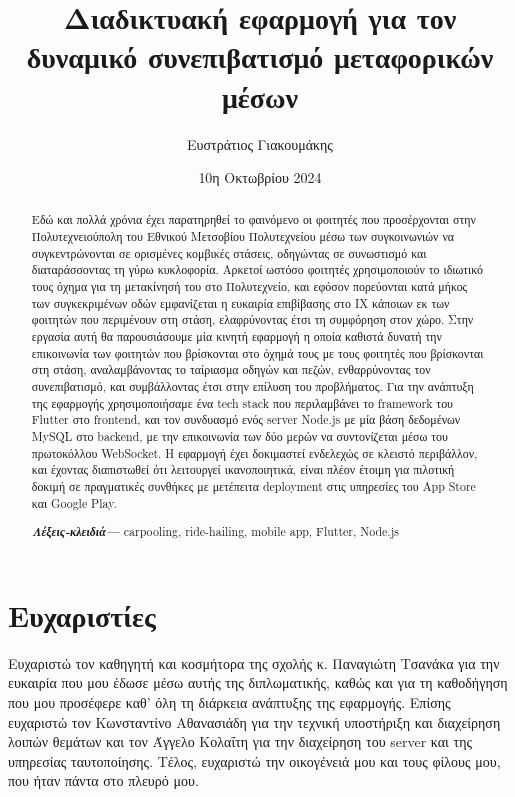 \documentclass[a4paper, 11pt]{report}
\title{
    {Διαδικτυακή εφαρμογή για τον δυναμικό συνεπιβατισμό μεταφορικών μέσων}
}
\author{Ευστράτιος Γιακουμάκης}
\date{10η Οκτωβρίου 2024}
\newcommand\blankpage{%
    \null
    \thispagestyle{empty}%
    \newpage
    }
\begin{document}
\maketitle

\begin{abstract}\thispagestyle{plain}
    Εδώ και πολλά χρόνια έχει παρατηρηθεί το φαινόμενο οι φοιτητές που προσέρχονται στην Πολυτεχνειούπολη του Εθνικού Μετσοβίου Πολυτεχνείου μέσω των συγκοινωνιών να συγκεντρώνονται σε ορισμένες κομβικές στάσεις, οδηγώντας σε συνωστισμό και διαταράσσοντας τη γύρω κυκλοφορία.
    Αρκετοί ωστόσο φοιτητές χρησιμοποιούν το ιδιωτικό τους όχημα για τη μετακίνησή του στο Πολυτεχνείο, και εφόσον πορεύονται κατά μήκος των συγκεκριμένων οδών εμφανίζεται η ευκαιρία επιβίβασης στο ΙΧ κάποιων εκ των φοιτητών που περιμένουν στη στάση, ελαφρύνοντας έτσι τη συμφόρηση στον χώρο.
    Στην εργασία αυτή θα παρουσιάσουμε μία κινητή εφαρμογή η οποία καθιστά δυνατή την επικοινωνία των φοιτητών που βρίσκονται στο όχημά τους με τους φοιτητές που βρίσκονται στη στάση, αναλαμβάνοντας το ταίριασμα οδηγών και πεζών, ενθαρρύνοντας τον συνεπιβατισμό, και συμβάλλοντας έτσι στην επίλυση του προβλήματος.
    Για την ανάπτυξη της εφαρμογής χρησιμοποιήσαμε ένα tech stack που περιλαμβάνει το framework του Flutter στο frontend, και τον συνδυασμό ενός server Node.js με μία βάση δεδομένων MySQL στο backend, με την επικοινωνία των δύο μερών να συντονίζεται μέσω του πρωτοκόλλου WebSocket.
    Η εφαρμογή έχει δοκιμαστεί ενδελεχώς σε κλειστό περιβάλλον, και έχοντας διαπιστωθεί ότι λειτουργεί ικανοποιητικά, είναι πλέον έτοιμη για πιλοτική δοκιμή σε πραγματικές συνθήκες με μετέπειτα deployment στις υπηρεσίες του App Store και Google Play.
    
    \hspace{10pt}

    \small	
    \textbf{\textit{Λέξεις-κλειδιά---}}
    carpooling, ride-hailing, mobile app, Flutter, Node.js
    \afterpage{\blankpage}
\end{abstract}

\section*{Ευχαριστίες}
Ευχαριστώ τον καθηγητή και κοσμήτορα της σχολής κ. Παναγιώτη Τσανάκα για την ευκαιρία που μου έδωσε μέσω αυτής της διπλωματικής, καθώς και για τη καθοδήγηση που μου προσέφερε καθ' όλη τη διάρκεια ανάπτυξης της εφαρμογής. Επίσης ευχαριστώ τον Κωνσταντίνο Αθανασιάδη για την τεχνική υποστήριξη και διαχείρηση λοιπών θεμάτων και τον Άγγελο Κολαΐτη για την διαχείρηση του server και της υπηρεσίας ταυτοποίησης. Τέλος, ευχαριστώ την οικογένειά μου και τους φίλους μου, που ήταν πάντα στο πλευρό μου.
\end{document}
